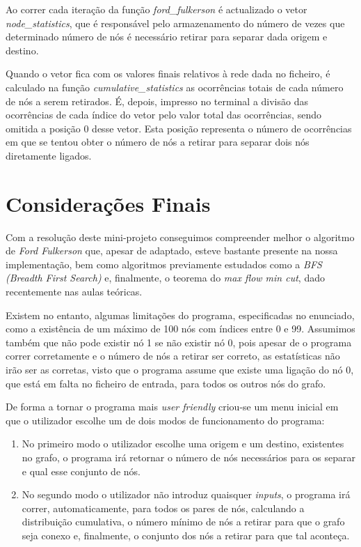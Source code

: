 \documentclass[a4paper]{article}
\begin{document}
Ao correr cada iteração da função \textit{ford\_fulkerson} é actualizado o vetor \textit{node\_statistics}, que é responsável pelo armazenamento do número de vezes que determinado número de nós é necessário retirar para separar dada origem e destino.

Quando o vetor fica com os valores finais relativos à rede dada no ficheiro, é calculado na função \textit{cumulative\_statistics} as ocorrências totais de cada número de nós a serem retirados. É, depois, impresso no terminal a divisão das ocorrências de cada índice do vetor pelo valor total das ocorrências, sendo omitida a posição 0 desse vetor. Esta posição representa o número de ocorrências em que se tentou obter o número de nós a retirar para separar dois nós diretamente ligados. 


\section{Considerações Finais}
Com a resolução deste mini-projeto conseguimos compreender melhor o algoritmo de \textit{Ford Fulkerson} que, apesar de adaptado, esteve bastante presente na nossa implementação, bem como algoritmos previamente estudados como a \textit{BFS (Breadth First Search)} e, finalmente, o teorema do \textit{max flow min cut}, dado recentemente nas aulas teóricas.

Existem no entanto, algumas limitações do programa, especificadas no enunciado, como a existência de um máximo de 100 nós com índices entre 0 e 99. Assumimos também que não pode existir nó 1 se não existir nó 0, pois apesar de o programa correr corretamente e o número de nós a retirar ser correto, as estatísticas não irão ser as corretas, visto que o programa assume que existe uma ligação do nó 0, que está em falta no ficheiro de entrada, para todos os outros nós do grafo.

De forma a tornar o programa mais \textit{user friendly} criou-se um menu inicial em que o utilizador escolhe um de dois modos de funcionamento do programa:

\begin{enumerate}
	\item No primeiro modo o utilizador escolhe uma origem e um destino, existentes no grafo, o programa irá retornar o número de nós necessários para os separar e qual esse conjunto de nós.
	\item No segundo modo o utilizador não introduz quaisquer \textit{inputs}, o programa irá correr, automaticamente, para todos os pares de nós, calculando a distribuição cumulativa, o número mínimo de nós a retirar para que o grafo seja conexo e, finalmente, o conjunto dos nós a retirar para que tal aconteça.
\end{enumerate}
\end{document}
